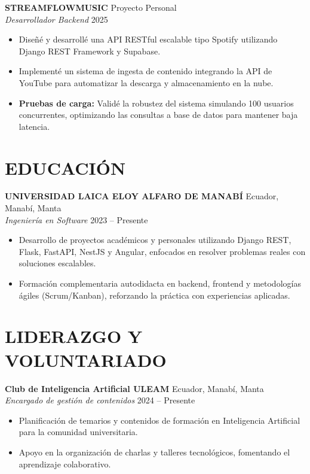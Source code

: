 \documentclass[11pt, a4paper]{article}
\begin{document}
\vspace{4pt}

\textbf{STREAMFLOWMUSIC} \hfill Proyecto Personal \\
\textit{Desarrollador Backend} \hfill 2025

\begin{itemize}
\item Diseñé y desarrollé una API RESTful escalable tipo Spotify utilizando Django REST Framework y Supabase.
\item Implementé un sistema de ingesta de contenido integrando la API de YouTube para automatizar la descarga y almacenamiento en la nube.
\item \textbf{Pruebas de carga:} Validé la robustez del sistema simulando 100 usuarios concurrentes, optimizando las consultas a base de datos para mantener baja latencia.
\end{itemize}

\section*{EDUCACIÓN}

\textbf{UNIVERSIDAD LAICA ELOY ALFARO DE MANABÍ} \hfill Ecuador, Manabí, Manta \\
\textit{Ingeniería en Software} \hfill 2023 -- Presente

\begin{itemize}
\item Desarrollo de proyectos académicos y personales utilizando Django REST, Flask, FastAPI, NestJS y Angular, enfocados en resolver problemas reales con soluciones escalables.
\item Formación complementaria autodidacta en backend, frontend y metodologías ágiles (Scrum/Kanban), reforzando la práctica con experiencias aplicadas.
\end{itemize}

\section*{LIDERAZGO Y VOLUNTARIADO}

\textbf{Club de Inteligencia Artificial ULEAM} \hfill Ecuador, Manabí, Manta \\
\textit{Encargado de gestión de contenidos} \hfill 2024 -- Presente

\begin{itemize}
\item Planificación de temarios y contenidos de formación en Inteligencia Artificial para la comunidad universitaria.
\item Apoyo en la organización de charlas y talleres tecnológicos, fomentando el aprendizaje colaborativo.
\end{itemize}
\end{document}
